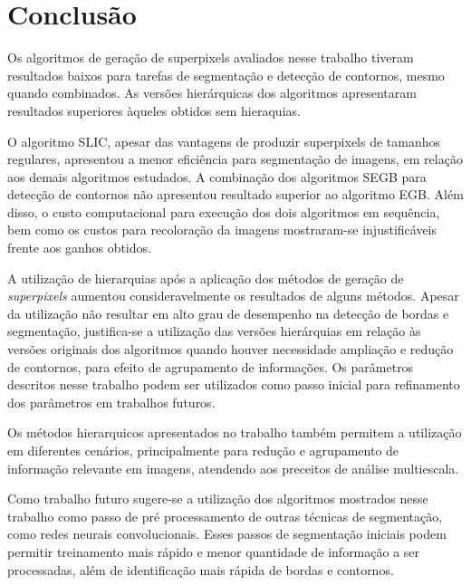 \begin{document}

\section{Conclusão} \label{sec:conclusao}

Os algoritmos de geração de superpixels avaliados nesse trabalho tiveram resultados baixos para tarefas de segmentação e detecção de contornos, mesmo quando combinados. As versões hierárquicas dos algoritmos apresentaram resultados superiores àqueles obtidos sem hieraquias.

O algoritmo SLIC, apesar das vantagens de produzir superpixels de tamanhos regulares, apresentou a menor eficiência para segmentação de imagens, em relação aos demais algoritmos estudados. A combinação dos algoritmos SEGB para detecção de contornos não apresentou resultado   superior ao algoritmo EGB. Além disso, o custo computacional para execução dos dois algoritmos em sequência, bem como os custos para recoloração da imagens mostraram-se injustificáveis frente aos ganhos obtidos.

A utilização de hierarquias após a aplicação dos métodos de geração de \textit{superpixels} aumentou consideravelmente os resultados de alguns métodos. Apesar da utilização não resultar em alto grau de desempenho na detecção de bordas e segmentação, justifica-se a utilização das versões hierárquias em relação às versões originais dos algoritmos quando houver necessidade ampliação e redução de contornos, para efeito de agrupamento de informações. Os parâmetros descritos nesse trabalho podem ser utilizados como passo inicial para refinamento dos parâmetros em trabalhos futuros.

Os métodos hierarquicos apresentados no trabalho também permitem a utilização em diferentes cenários, principalmente para redução e agrupamento de informação relevante em imagens, atendendo aos preceitos de análise multiescala.

Como trabalho futuro sugere-se a utilização dos algoritmos mostrados nesse trabalho como passo de pré processamento de outras técnicas de segmentação, como redes neurais convolucionais. Esses passos de segmentação iniciais podem permitir treinamento mais rápido e menor quantidade de informação a ser processadas, além de identificação mais rápida de bordas e contornos.




\end{document}
